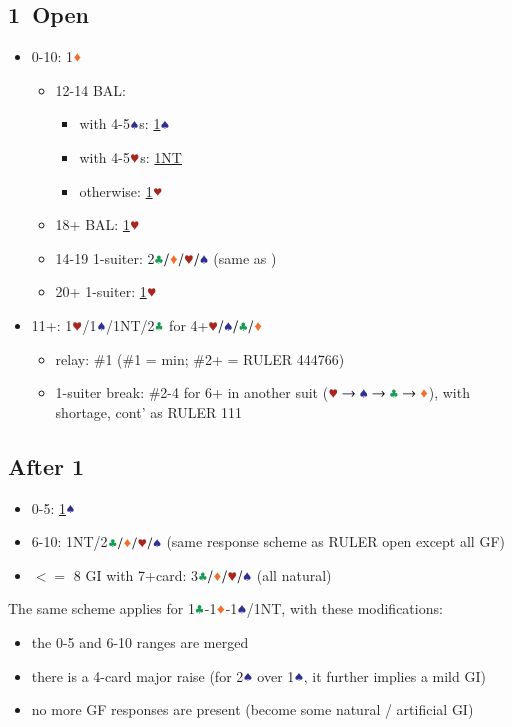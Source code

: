 \documentclass{article}
\begin{document}
\begin{multicols}{2}
\begin{CJK*}{UTF8}{gt}
\section{1\CCC\ Open}\label{sec:1c}
\begin{itemize}
    \item 0-10: 1$\ddd$
    \begin{itemize}
        \item 12-14 BAL:
        \begin{itemize}
            \item with 4-5$\sss$s: \hyperref[sec:1c1d1h]{1$\sss$}
            \item with 4-5$\hhh$s: \hyperref[sec:1c1d1h]{1NT}
            \item otherwise: \hyperref[sec:1c1d1h]{1$\hhh$}
        \end{itemize}
        \item 18+ BAL: \hyperref[sec:1c1d1h]{1$\hhh$}
        \item 14-19 1-suiter: 2$\ccc/\ddd/\hhh/\sss$ (same as )
        \item 20+ 1-suiter: \hyperref[sec:1c1d1h]{1$\hhh$}
    \end{itemize}
    \item 11+: 1$\hhh$/1$\sss$/1NT/2$\ccc$ 
    for 4+$\hhh/\sss/\ccc/\ddd$
    \begin{itemize}
        \item relay: \#1 (\#1 = min; \#2+ = RULER 444766)
        \item 1-suiter break: \#2-4 for 6+ in another suit ($\hscd$), with shortage, cont' as RULER 111
    \end{itemize}
\end{itemize}

\subsection{After 1\HHH}\label{sec:1c1d1h}
\begin{itemize}
    \item 0-5: \hyperref[sec:1c1d1h1s]{1$\sss$}
    \item 6-10: 1NT/2$\ccc/\ddd/\hhh/\sss$
        (same response scheme as RULER open except all GF)
    \item $<=$ 8 GI with 7+card: 3$\ccc/\ddd/\hhh/\sss$ (all natural)
\end{itemize}

\noindent The same scheme applies for 1$\ccc$-1$\ddd$-1$\sss$/1NT, with these modifications:
\begin{itemize}
    \item the 0-5 and 6-10 ranges are merged
    \item there is a 4-card major raise (for 2$\sss$ over 1$\sss$, it further implies a mild GI)
    \item no more GF responses are present (become some natural / artificial GI)
\end{itemize}


\end{CJK*}
\end{multicols}
\end{document}
